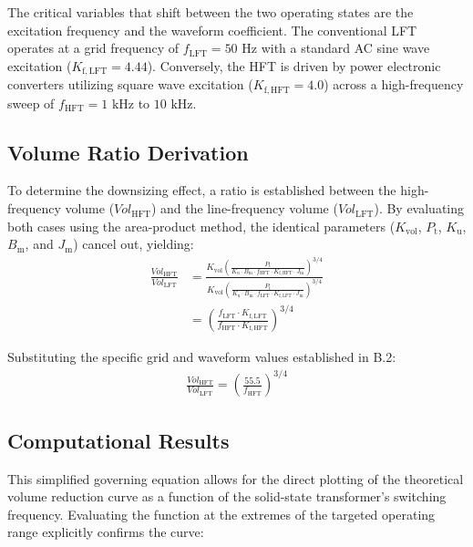 The critical variables that shift between the two operating states are the excitation frequency and the waveform coefficient. The conventional LFT operates at a grid frequency of $f_{\mathrm{LFT}} = 50 \text{ Hz}$ with a standard AC sine wave excitation ($K_{\mathrm{f,LFT}} = 4.44$). Conversely, the HFT is driven by power electronic converters utilizing square wave excitation ($K_{\mathrm{f,HFT}} = 4.0$) across a high-frequency sweep of $f_{\mathrm{HFT}} = 1 \text{ kHz}$ to $10 \text{ kHz}$. 

\subsection*{Volume Ratio Derivation}
To determine the downsizing effect, a ratio is established between the high-frequency volume ($Vol_{\mathrm{HFT}}$) and the line-frequency volume ($Vol_{\mathrm{LFT}}$). By evaluating both cases using the area-product method, the identical parameters ($K_{\mathrm{vol}}$, $P_{\mathrm{t}}$, $K_{\mathrm{u}}$, $B_{\mathrm{m}}$, and $J_{\mathrm{m}}$) cancel out, yielding:
$$ \begin{aligned}
    \frac{Vol_{\mathrm{HFT}}}{Vol_{\mathrm{LFT}}} &= \frac{ K_{\mathrm{vol}} \left( \frac{P_{\mathrm{t}}}{K_{\mathrm{u}} \cdot B_{\mathrm{m}} \cdot f_{\mathrm{HFT}} \cdot K_{\mathrm{f,HFT}} \cdot J_{\mathrm{m}}} \right)^{3/4} }{ K_{\mathrm{vol}} \left( \frac{P_{\mathrm{t}}}{K_{\mathrm{u}} \cdot B_{\mathrm{m}} \cdot f_{\mathrm{LFT}} \cdot K_{\mathrm{f,LFT}} \cdot J_{\mathrm{m}}} \right)^{3/4} } \\
    &= \left( \frac{f_{\mathrm{LFT}} \cdot K_{\mathrm{f,LFT}}}{f_{\mathrm{HFT}} \cdot K_{\mathrm{f,HFT}}} \right)^{3/4}
\end{aligned} $$

Substituting the specific grid and waveform values established in B.2:
$$ \begin{aligned}
    \frac{Vol_{\mathrm{HFT}}}{Vol_{\mathrm{LFT}}} = \left( \frac{55.5}{f_{\mathrm{HFT}}} \right)^{3/4}
\end{aligned} $$

\subsection*{Computational Results}
This simplified governing equation allows for the direct plotting of the theoretical volume reduction curve as a function of the solid-state transformer's switching frequency. Evaluating the function at the extremes of the targeted operating range explicitly confirms the curve:

